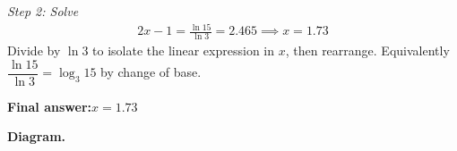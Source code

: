 \documentclass[11pt]{article}
\begin{document}
\textit{Step 2: Solve}
\[\begin{gathered}
2x - 1 = \frac{\ln 15}{\ln 3} = 2.465 \implies x = 1.73
\end{gathered}\]
Divide by \( \ln 3 \) to isolate the linear expression in \( x \), then rearrange. Equivalently \( \dfrac{\ln 15}{\ln 3} = \log_3 15 \) by change of base.

\begin{answerbox}
\textbf{Final answer:}\quad \(\displaystyle x = 1.73\)
\end{answerbox}
\textbf{Diagram.}

\begin{center}
\end{center}
\end{document}
